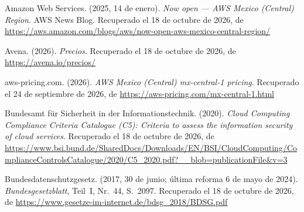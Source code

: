 \documentclass[12pt, a4paper]{article}
\begin{document}
\begin{list}{}{\setlength{\leftmargin}{1.27cm}\setlength{\itemindent}{-1.27cm}%
  \setlength{\labelwidth}{0pt}\setlength{\labelsep}{0pt}\setlength{\itemsep}{6pt}}
\item Amazon Web Services. (2025, 14 de enero). \textit{Now open ---
  AWS Mexico (Central) Region}. AWS News Blog.
  Recuperado el 18 de octubre de 2026, de \url{https://aws.amazon.com/blogs/aws/now-open-aws-mexico-central-region/}
 
\item Avena. (2026). \textit{Precios}. Recuperado el 18 de octubre de 2026, de \url{https://avena.io/precios/}
 
 
\item aws-pricing.com. (2026). \textit{AWS Mexico (Central)
  mx-central-1 pricing}. Recuperado el 24 de septiembre de 2026, de
  \url{https://aws-pricing.com/mx-central-1.html}
 

\item Bundesamt für Sicherheit in der Informationstechnik. (2020).
  \textit{Cloud Computing Compliance Criteria Catalogue (C5):
  Criteria to assess the information security of cloud services}. Recuperado el 18 de octubre de 2026, de \url{https://www.bsi.bund.de/SharedDocs/Downloads/EN/BSI/CloudComputing/ComplianceControlsCatalogue/2020/C5_2020.pdf?__blob=publicationFile&v=3}

 
\item Bundesdatenschutzgesetz. (2017, 30 de junio; última reforma
  6 de mayo de 2024). \textit{Bundesgesetzblatt}, Teil~I, Nr.~44,
  S.~2097.
  Recuperado el 18 de octubre de 2026, de \url{https://www.gesetze-im-internet.de/bdsg_2018/BDSG.pdf}



\end{list}
\end{document}
